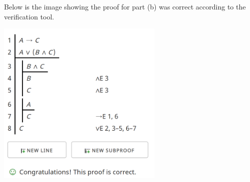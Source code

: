 \documentclass{article}
\newcommand*\fixindent{ \hspace{1pt}\\}
\begin{document}
\newpage
\begin{flushleft}
Below is the image showing the proof for part (b) was correct according to the verification tool.\\
\begin{centering}\hspace*{1pt}\includegraphics[width=300px, height = 300px]{3b.png}\end{centering}
\end{flushleft}
\fixindent{}
\end{document}
